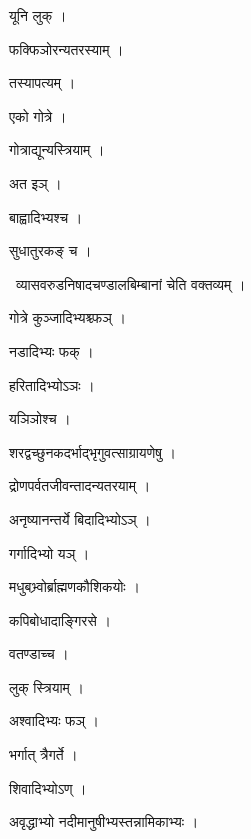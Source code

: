 \documentclass[10pt, openany, oneside]{book}
\begin{document}
\noindent यूनि लुक् ।

\noindent फक्फिञोरन्यतरस्याम् ।

\noindent तस्यापत्यम् ।

\noindent एको गोत्रे ।

\noindent गोत्राद्यून्यस्त्रियाम् ।

\noindent अत इञ् ।

\noindent बाह्वादिभ्यश्च ।

\noindent सुधातुरकङ् च ।

\par\noindent\hspace{1.5em}{\vps वा॰}~{\qt व्यासवरुडनिषादचण्डालबिम्बानां चेति वक्तव्यम् ।}

\noindent गोत्रे कुञ्जादिभ्यश्च्फञ् ।

\noindent नडादिभ्यः फक् ।

\noindent हरितादिभ्योऽञः ।

\noindent यञिञोश्च ।

\noindent शरद्वच्छुनकदर्भाद्भृगुवत्साग्रायणेषु ।

\noindent द्रोणपर्वतजीवन्तादन्यतरयाम् ।

\noindent अनृष्यानन्तर्ये बिदादिभ्योऽञ् ।

\noindent गर्गादिभ्यो यञ् ।

\noindent मधुबभ्र्वोर्ब्राह्मणकौशिकयोः ।

\noindent कपिबोधादाङ्गिरसे ।

\noindent वतण्डाच्च ।

\noindent लुक् स्त्रियाम् ।

\noindent अश्वादिभ्यः फञ् ।

\noindent भर्गात् त्रैगर्ते ।

\noindent शिवादिभ्योऽण् ।

\noindent अवृद्धाभ्यो नदीमानुषीभ्यस्तन्नामिकाभ्यः ।
\end{document}
